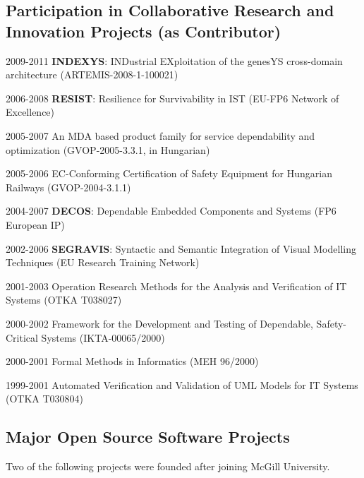 \subsection{Participation in Collaborative Research and Innovation Projects (as Contributor)}
\begin{yearlist}
\item[2009-2011] \textbf{INDEXYS}: INDustrial EXploitation of the genesYS cross-domain architecture (ARTEMIS-2008-1-100021) 
\item[2006-2008] \textbf{RESIST}: Resilience for Survivability in IST (EU-FP6 Network of Excellence)  
\item[2005-2007] An MDA based product family for service dependability and optimization (GVOP-2005-3.3.1, in Hungarian)  
\item[2005-2006] EC-Conforming Certification of Safety Equipment for Hungarian Railways (GVOP-2004-3.1.1) 
\item[2004-2007] \textbf{DECOS}: Dependable Embedded Components and Systems (FP6 European IP) 
\item[2002-2006] \textbf{SEGRAVIS}: Syntactic and Semantic Integration of
Visual Modelling Techniques (EU Research Training Network) 
\item[2001-2003] Operation Research Methods for the Analysis and Verification of IT Systems (OTKA T038027) 
\item[2000-2002] Framework for the Development and Testing of Dependable, Safety-Critical Systems (IKTA-00065/2000) 
\item[2000-2001] Formal Methods in Informatics (MEH 96/2000) 
\item[1999-2001] Automated Verification and Validation of UML Models for IT Systems (OTKA T030804) 
\end{yearlist}



\subsection{Major Open Source Software Projects}
Two of the following projects were founded after joining McGill University.

